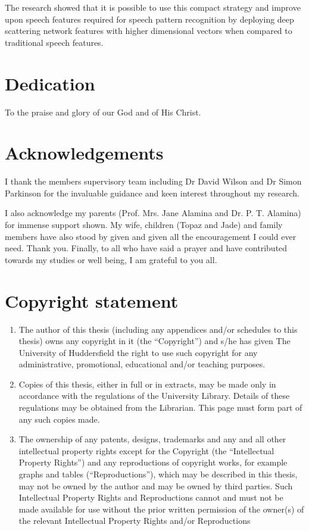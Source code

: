 \documentclass[12pt,twoside]{report}
\begin{document}
The research showed that it is possible to use this compact strategy and improve upon speech features required for speech pattern recognition by deploying deep scattering network features with higher dimensional vectors when compared to traditional speech features.
\stopblue
{}


\chapter*{Dedication}
To the praise and glory of our God and of His Christ.

\chapter*{Acknowledgements}
I thank the members supervisory team including Dr David Wilson and Dr Simon Parkinson for the invaluable guidance and keen interest throughout my research.  

I also acknowledge my parents (Prof. Mrs. Jane Alamina and Dr. P. T. Alamina) for immense support shown.  My wife, children (Topaz and Jade) and family members have also stood by given and given all the encouragement I could ever need.  Thank you.  Finally, to all who have said a prayer and have contributed towards my studies or well being, I am grateful to you all.

\chapter*{Copyright statement}
\renewcommand{\theenumi}{\roman{enumi}}%
\begin{enumerate}
    \item The author of this thesis (including any appendices and/or schedules to this thesis) owns any copyright in it (the “Copyright”) and s/he has given The University of Huddersfield the right to use such copyright for any administrative, promotional, educational and/or teaching purposes.
    \item Copies of this thesis, either in full or in extracts, may be made only in accordance with the regulations of the University Library. Details of these regulations may be obtained from the Librarian. This page must form part of any such copies made.
    \item The ownership of any patents, designs, trademarks and any and all other intellectual property rights except for the Copyright (the “Intellectual Property Rights”) and any reproductions of copyright works, for example graphs and tables (“Reproductions”), which may be described in this thesis, may not be owned by the author and may be owned by third parties. Such Intellectual Property Rights and Reproductions cannot and must not be made available for use without the prior written permission of the owner(s) of the relevant Intellectual Property Rights and/or Reproductions
\end{enumerate}
\end{document}
